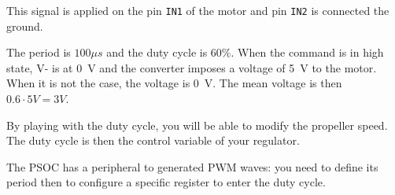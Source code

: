 \documentclass[11pt,a4paper]{article}
\theoremstyle{definition}%
\begin{document}
This signal is applied on the pin \texttt{IN1} of the motor and pin \texttt{IN2} is connected the ground.

The period is $100 \mu s$ and the duty cycle is $60\%$.
When the command is in high state, V- is at 0~V and the converter imposes a voltage of 5~V to the motor.
When it is not the case, the voltage is 0~V.
The mean voltage is then $0.6 \cdot 5V  = 3 V$.

\begin{framed}
By playing with the duty cycle, you will be able to modify the propeller speed.
The duty cycle is then the control variable of your regulator.
\end{framed}

The PSOC has a peripheral to generated PWM waves: you need to define its period then to configure a specific register to enter the duty cycle.
\end{document}
